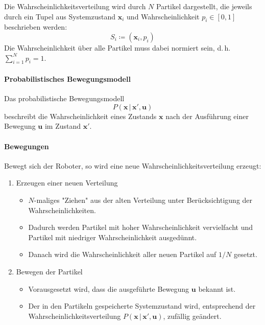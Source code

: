 \documentclass[a4paper, 11pt, accentcolor = tud3b]{tudreport}
\newcommand{\given}{\,\vert\,}
\renewcommand{\vec}[1]{\boldsymbol{#1}}
\renewcommand{\dh}{d.\,h.~}
\begin{document}
					Die Wahrscheinlichkeitsverteilung wird durch \(N\) Partikel dargestellt, die jeweils durch ein Tupel aus Systemzustand \( \vec{x}_i \) und Wahrscheinlichkeit \( p_i \in [0, 1] \) beschrieben werden:
					\begin{equation*}
						S_i \coloneqq (\vec{x}_i, p_i)
					\end{equation*}
					Die Wahrscheinlichkeit über alle Partikel muss dabei normiert sein, \dh \( \sum_{i = 1}^{N} p_i = 1 \).
					
					\paragraph{Probabilistisches Bewegungsmodell}
						Das probabilistische Bewegungsmodell
						\begin{equation*}
							P(\vec{x} \given \vec{x}', \vec{u})
						\end{equation*}
						beschreibt die Wahrscheinlichkeit eines Zustands \( \vec{x} \) nach der Ausführung einer Bewegung \( \vec{u} \) im Zustand \( \vec{x}' \).
					
					\paragraph{Bewegungen}
						Bewegt sich der Roboter, so wird eine neue Wahrscheinlichkeitsverteilung erzeugt:
						\begin{enumerate}
							\item Erzeugen einer neuen Verteilung
								\begin{itemize}
									\item \(N\)-maliges "Ziehen" aus der alten Verteilung unter Berücksichtigung der Wahrscheinlichkeiten.
									\item Dadurch werden Partikel mit hoher Wahrscheinlichkeit vervielfacht und Partikel mit niedriger Wahrscheinlichkeit ausgedünnt.
									\item Danach wird die Wahrscheinlichkeit aller neuen Partikel auf \( 1/N \) gesetzt.
								\end{itemize}
							\item Bewegen der Partikel
								\begin{itemize}
									\item Vorausgesetzt wird, dass die ausgeführte Bewegung \( \vec{u} \) bekannt ist.
									\item Der in den Partikeln gespeicherte Systemzustand wird, entsprechend der Wahrscheinlichkeitsverteilung \( P(\vec{x} \given \vec{x}', \vec{u}) \), zufällig geändert.
								\end{itemize}
						\end{enumerate}
					
\end{document}
